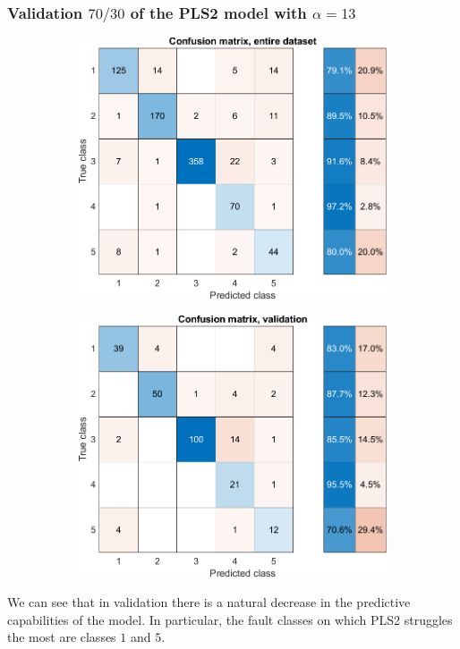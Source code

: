 \begin{frame}
	\frametitle{Validation $70/30$ of the PLS2 model with $\alpha = 13$}
	\begin{figure}
		\begin{subfigure}[b]{0.49\textwidth}
			\includegraphics[width=\textwidth]{Images/confusion_all_5_PLS2.pdf}
		\end{subfigure}
		\hfill
		\begin{subfigure}[b]{0.49\textwidth}
			\includegraphics[width=\textwidth]{Images/confusion_val_5_PLS2.pdf}
		\end{subfigure}
	\end{figure}
	We can see that in validation there is a natural decrease in the predictive capabilities of the model. In particular, the fault classes on which PLS2 struggles the most are classes $1$ and $5$.
\end{frame}

